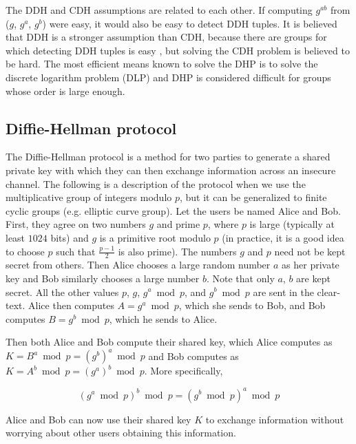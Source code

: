 The DDH and CDH assumptions are related to each other. If computing $g^{ab}$ from ($g$, $g^a$, $g^b$) were easy, it would also be easy to detect DDH tuples. It is believed that DDH is a stronger assumption than CDH, because there are groups for which detecting DDH tuples is easy \cite{cryptoeprint:2004:070}, but solving the CDH problem is believed to be hard. The most efficient means known to solve the DHP is to solve the discrete logarithm problem (DLP) and DHP is considered difficult for groups whose order is large enough.


\subsection{Diffie-Hellman protocol}

The Diffie-Hellman protocol is a method for two parties to generate a shared private key with which they can then exchange information across an insecure channel. The following is a description of the protocol when we use the multiplicative group of integers modulo $p$, but it can be generalized to finite cyclic groups (e.g. elliptic curve group). Let the users be named Alice and Bob. First, they agree on two numbers $g$ and prime $p$, where $p$ is large (typically at least $1024$ bits) and $g$ is a primitive root modulo $p$ (in practice, it is a good idea to choose  $p$ such that $\frac{p-1}{2}$ is also prime). The numbers $g$ and $p$ need not be kept secret from others. Then Alice chooses a large random number $a$ as her private key and Bob similarly chooses a large number $b$. Note that only $a$, $b$ are kept secret. All the other values $p$, $g$, $g^{a} \bmod p$, and $g^{b} \bmod p$ are sent in the clear-text. Alice then computes $A = g^a \bmod p$, which she sends to Bob, and Bob computes $B = g^b \bmod p$, which he sends to Alice.

Then both Alice and Bob compute their shared key, which Alice computes as $K=B^a \bmod p = (g^b)^a \bmod p$ and Bob computes as $K=A^b \bmod p= (g^a)^b \bmod p$. More specifically,

\begin{equation}
    (g^{a} \bmod p)^{b} \bmod p = (g^{b} \bmod p)^{a} \bmod p
\end{equation}

Alice and Bob can now use their shared key $K$ to exchange information without worrying about other users obtaining this information.

